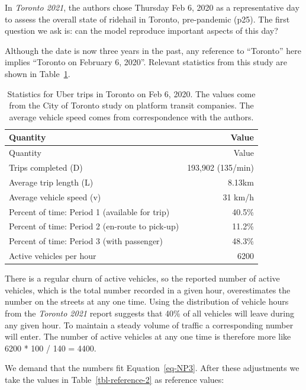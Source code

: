 \documentclass[
  letterpaper,
  DIV=11,
  numbers=noendperiod]{scrartcl}
\begin{document}
In \emph{Toronto 2021}, the authors chose Thursday Feb 6, 2020 as a
representative day to assess the overall state of ridehail in Toronto,
pre-pandemic (p25). The first question we ask is: can the model
reproduce important aspects of this day?

Although the date is now three years in the past, any reference to
``Toronto'' here implies ``Toronto on February 6, 2020''. Relevant
statistics from this study are shown in
Table~\ref{tbl-reference-values}.

\hypertarget{tbl-reference-values}{}
\begin{longtable}[]{@{}lr@{}}
\caption{\label{tbl-reference-values}Statistics for Uber trips in
Toronto on Feb 6, 2020. The values come from the City of Toronto study
on platform transit companies. The average vehicle speed comes from
correspondence with the authors.}\tabularnewline
\toprule()
Quantity & Value \\
\midrule()
\endfirsthead
\toprule()
Quantity & Value \\
\midrule()
\endhead
Trips completed (D) & 193,902 (135/min) \\
Average trip length (L) & 8.13km \\
Average vehicle speed (v) & 31 km/h \\
Percent of time: Period 1 (available for trip) & 40.5\% \\
Percent of time: Period 2 (en-route to pick-up) & 11.2\% \\
Percent of time: Period 3 (with passenger) & 48.3\% \\
Active vehicles per hour & 6200 \\
\bottomrule()
\end{longtable}

There is a regular churn of active vehicles, so the reported number of
active vehicles, which is the total number recorded in a given hour,
overestimates the number on the streets at any one time. Using the
distribution of vehicle hours from the \emph{Toronto 2021} report
suggests that 40\% of all vehicles will leave during any given hour. To
maintain a steady volume of traffic a corresponding number will enter.
The number of active vehicles at any one time is therefore more like
6200 * 100 / 140 = 4400.

We demand that the numbers fit Equation~\ref{eq-NP3}. After these
adjustments we take the values in Table~\ref{tbl-reference-2} as
reference values:
\end{document}
